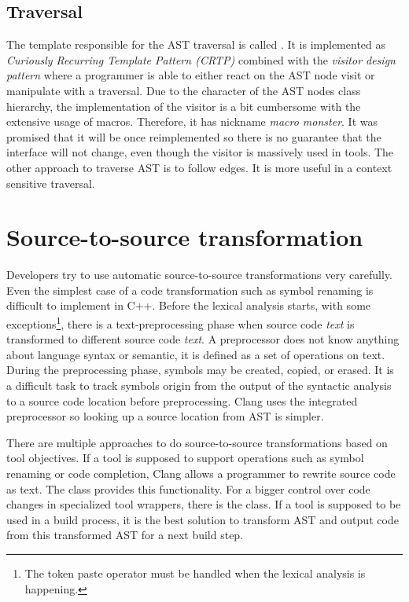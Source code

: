 \subsection{Traversal}
\label{clang-ast-traversal}
The template responsible for the AST traversal is called . It is implemented as \emph{Curiously Recurring Template Pattern (CRTP)} combined with the \emph{visitor design pattern} where a programmer is able to either react on the AST node visit or manipulate with a traversal. Due to the character of the AST nodes class hierarchy, the implementation of the visitor is a bit cumbersome with the extensive usage of macros. Therefore, it has nickname \textit{macro monster}. It was promised that it will be once reimplemented so there is no guarantee that the interface will not change, even though the visitor is massively used in tools. The other approach to traverse AST is to follow edges. It is more useful in a context sensitive traversal.

\section{Source-to-source transformation}
Developers try to use automatic source-to-source transformations very carefully. Even the simplest case of a code transformation such as symbol renaming is difficult to implement in C++. Before the lexical analysis starts, with some exceptions\footnote{The token paste operator \code{\#\#} must be handled when the lexical analysis is happening.}, there is a text-preprocessing phase when source code \emph{text} is transformed to different source code \emph{text}. A preprocessor does not know anything about language syntax or semantic, it is defined as a set of operations on text. During the preprocessing phase, symbols may be created, copied, or erased. It is a difficult task to track symbols origin from the output of the syntactic analysis to a source code location before preprocessing. Clang uses the integrated preprocessor so looking up a source location from AST is simpler.

There are multiple approaches to do source-to-source transformations based on tool objectives. If a tool is supposed to support operations such as symbol renaming or code completion, Clang allows a programmer to rewrite source code as text. The  class provides this functionality. For a bigger control over code changes in specialized tool wrappers, there is the  class. If a tool is supposed to be used in a build process, it is the best solution to transform AST and output code from this transformed AST for a next build step.

